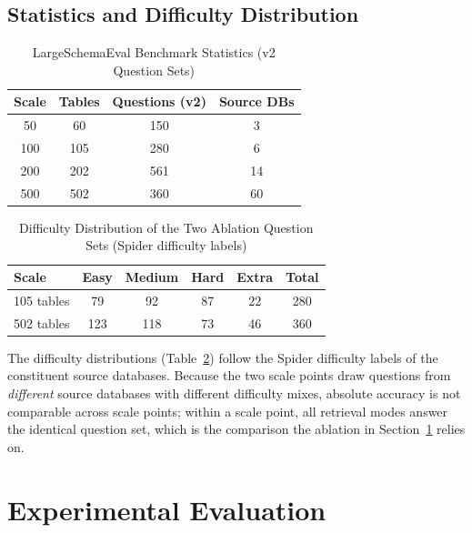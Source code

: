 \documentclass[conference]{IEEEtran}
\begin{document}
\subsection{Statistics and Difficulty Distribution}

\begin{table}[!htb]
\caption{LargeSchemaEval Benchmark Statistics (v2 Question Sets)}
\label{tab:benchmark_stats}
\centering
\small
\begin{tabular}{cccc}
\toprule
\textbf{Scale} & \textbf{Tables} & \textbf{Questions (v2)} & \textbf{Source DBs} \\
\midrule
50  & 60  & 150 & 3  \\
100 & 105 & 280 & 6  \\
200 & 202 & 561 & 14 \\
500 & 502 & 360 & 60 \\
\bottomrule
\end{tabular}
\end{table}

\begin{table}[!htb]
\caption{Difficulty Distribution of the Two Ablation Question Sets
(Spider difficulty labels)}
\label{tab:difficulty}
\centering
\small
\begin{tabular}{lcccc c}
\toprule
\textbf{Scale} & \textbf{Easy} & \textbf{Medium} & \textbf{Hard} & \textbf{Extra} & \textbf{Total} \\
\midrule
105 tables & 79  & 92  & 87 & 22 & 280 \\
502 tables & 123 & 118 & 73 & 46 & 360 \\
\bottomrule
\end{tabular}
\end{table}

The difficulty distributions (Table~\ref{tab:difficulty}) follow the
Spider difficulty labels of the constituent source databases. Because
the two scale points draw questions from \emph{different} source
databases with different difficulty mixes, absolute accuracy is not
comparable across scale points; within a scale point, all retrieval
modes answer the identical question set, which is the comparison the
ablation in Section~\ref{sec:experiments} relies on.

\section{Experimental Evaluation}
\label{sec:experiments}
\end{document}
